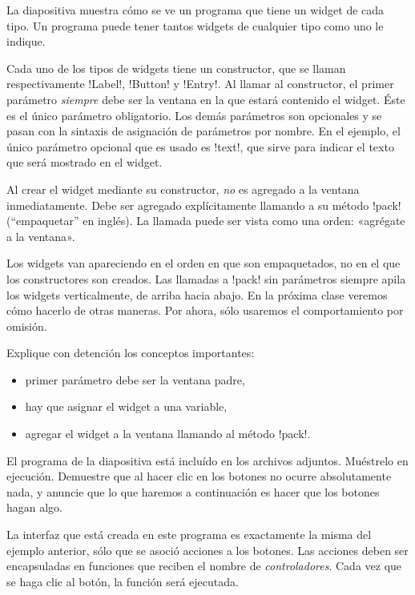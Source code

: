 \documentclass[10pt]{article}
\begin{document}
  La diapositiva muestra
  cómo se ve un programa que tiene un widget de cada tipo.
  Un programa puede tener tantos widgets de cualquier tipo
  como uno le indique.


  Cada uno de los tipos de widgets tiene un constructor,
  que se llaman respectivamente \li!Label!, \li!Button! y \li!Entry!.
  Al llamar al constructor,
  el primer parámetro \emph{siempre} debe ser
  la ventana en la que estará contenido el widget.
  Éste es el único parámetro obligatorio.
  Los demás parámetros son opcionales
  y se pasan con la sintaxis de asignación de parámetros por nombre.
  En el ejemplo,
  el único parámetro opcional que es usado es \li!text!,
  que sirve para indicar el texto que será mostrado en el widget.

  Al crear el widget mediante su constructor,
  \emph{no} es agregado a la ventana inmediatamente.
  Debe ser agregado explícitamente
  llamando a su método \li!pack!
  (``empaquetar'' en inglés).
  La llamada puede ser vista como una orden: «agrégate a la ventana».

  Los widgets van apareciendo en el orden en que son empaquetados,
  no en el que los constructores son creados.
  Las llamadas a \li!pack! sin parámetros
  siempre apila los widgets verticalmente,
  de arriba hacia abajo.
  En la próxima clase veremos cómo hacerlo de otras maneras.
  Por ahora, sólo usaremos el comportamiento por omisión.

  Explique con detención los conceptos importantes:
  \begin{itemize}
    \item primer parámetro debe ser la ventana padre,
    \item hay que asignar el widget a una variable,
    \item agregar el widget a la ventana
      llamando al método \li!pack!.
  \end{itemize}

  El programa de la diapositiva
  está incluído en los archivos adjuntos.
  Muéstrelo en ejecución.
  Demuestre que al hacer clic en los botones no ocurre absolutamente nada,
  y anuncie que lo que haremos a continuación
  es hacer que los botones hagan algo.


  La interfaz que está creada en este programa
  es exactamente la misma del ejemplo anterior,
  sólo que se asoció acciones a los botones.
  Las acciones deben ser encapsuladas en funciones
  que reciben el nombre de \emph{controladores}.
  Cada vez que se haga clic al botón,
  la función será ejecutada.
\end{document}
